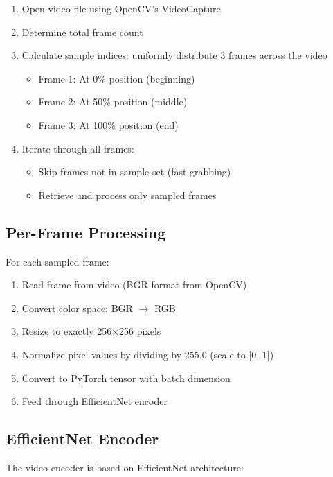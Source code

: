 \documentclass[12pt,a4paper]{book}
\begin{document}
\begin{enumerate}
    \item Open video file using OpenCV's VideoCapture
    \item Determine total frame count
    \item Calculate sample indices: uniformly distribute 3 frames across the video
    \begin{itemize}
        \item Frame 1: At 0\% position (beginning)
        \item Frame 2: At 50\% position (middle)
        \item Frame 3: At 100\% position (end)
    \end{itemize}
    \item Iterate through all frames:
    \begin{itemize}
        \item Skip frames not in sample set (fast grabbing)
        \item Retrieve and process only sampled frames
    \end{itemize}
\end{enumerate}

\subsection{Per-Frame Processing}

For each sampled frame:

\begin{enumerate}
    \item Read frame from video (BGR format from OpenCV)
    \item Convert color space: BGR $\rightarrow$ RGB
    \item Resize to exactly 256×256 pixels
    \item Normalize pixel values by dividing by 255.0 (scale to [0, 1])
    \item Convert to PyTorch tensor with batch dimension
    \item Feed through EfficientNet encoder
\end{enumerate}

\subsection{EfficientNet Encoder}

The video encoder is based on EfficientNet architecture:
\end{document}
